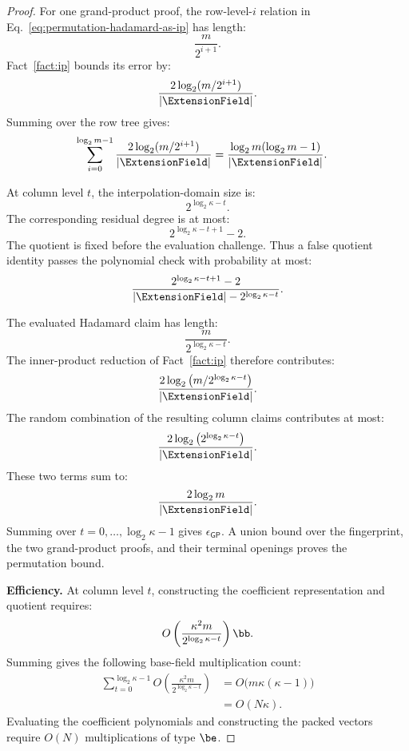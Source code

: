 \begin{proof}
For one grand-product proof, the row-level-\(i\) relation in
Eq.~\eqref{eq:permutation-hadamard-as-ip} has length:
\[
    \frac{m}{2^{i+1}}.
\]
Fact~\ref{fact:ip} bounds its error by:
\[
    \frac{
        2\log_2(m/2^{i+1})
    }{
        |\ExtensionField|
    }.
\]
Summing over the row tree gives:
\[
\begin{aligned}
    \sum_{i=0}^{\log_2m-1}
    \frac{
        2\log_2(m/2^{i+1})
    }{
        |\ExtensionField|
    }
    &=
    \frac{
        \log_2m(\log_2m-1)
    }{
        |\ExtensionField|
    }.
\end{aligned}
\]

At column level \(t\), the interpolation-domain size is:
\[
    2^{\log_2\kappa-t}.
\]
The corresponding residual degree is at most:
\[
    2^{\log_2\kappa-t+1}-2.
\]
The quotient is fixed before the evaluation challenge. Thus a
false quotient identity passes the polynomial check with probability
at most:
\[
    \frac{
        2^{\log_2\kappa-t+1}-2
    }{
        |\ExtensionField|
        -
        2^{\log_2\kappa-t}
    }.
\]

The evaluated Hadamard claim has length:
\[
    \frac{m}{2^{\log_2\kappa-t}}.
\]
The inner-product reduction of Fact~\ref{fact:ip} therefore
contributes:
\[
    \frac{
        2\log_2
        \left(
            m/2^{\log_2\kappa-t}
        \right)
    }{
        |\ExtensionField|
    }.
\]
The random combination of the resulting column claims
contributes at most:
\[
    \frac{
        2\log_2
        \left(
            2^{\log_2\kappa-t}
        \right)
    }{
        |\ExtensionField|
    }.
\]
These two terms sum to:
\[
    \frac{2\log_2m}{|\ExtensionField|}.
\]
Summing over \(t=0,\ldots,\log_2\kappa-1\) gives
\(\epsilon_{\mathsf{GP}}\). A union bound over the fingerprint,
the two grand-product proofs, and their terminal openings proves
the permutation bound.

\smallskip\noindent\textbf{Efficiency.}
At column level \(t\), constructing the coefficient representation
and quotient requires:
\[
    O\left(
        \frac{
            \kappa^2m
        }{
            2^{\log_2\kappa-t}
        }
    \right)\bb.
\]
Summing gives the following base-field multiplication count:
\[
\begin{aligned}
    \sum_{t=0}^{\log_2\kappa-1}
    O\left(
        \frac{
            \kappa^2m
        }{
            2^{\log_2\kappa-t}
        }
    \right)
    &=
    O\bigl(m\kappa(\kappa-1)\bigr)\\
    &=
    O(N\kappa).
\end{aligned}
\]
Evaluating the coefficient polynomials and constructing the
packed vectors require
\(O(N)\) multiplications of type \(\be\).


\end{proof}
